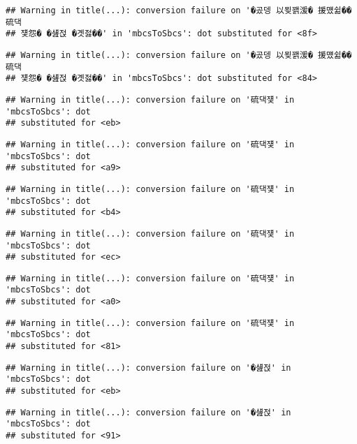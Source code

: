 \documentclass[
]{article}
\begin{document}
\begin{verbatim}
## Warning in title(...): conversion failure on '�곴뎅 以묒꽭湲� 援먰쉶�� 硫댁
## 쟻怨� �섎젅 �곗젏��' in 'mbcsToSbcs': dot substituted for <8f>
\end{verbatim}

\begin{verbatim}
## Warning in title(...): conversion failure on '�곴뎅 以묒꽭湲� 援먰쉶�� 硫댁
## 쟻怨� �섎젅 �곗젏��' in 'mbcsToSbcs': dot substituted for <84>
\end{verbatim}

\begin{verbatim}
## Warning in title(...): conversion failure on '硫댁쟻' in 'mbcsToSbcs': dot
## substituted for <eb>
\end{verbatim}

\begin{verbatim}
## Warning in title(...): conversion failure on '硫댁쟻' in 'mbcsToSbcs': dot
## substituted for <a9>
\end{verbatim}

\begin{verbatim}
## Warning in title(...): conversion failure on '硫댁쟻' in 'mbcsToSbcs': dot
## substituted for <b4>
\end{verbatim}

\begin{verbatim}
## Warning in title(...): conversion failure on '硫댁쟻' in 'mbcsToSbcs': dot
## substituted for <ec>
\end{verbatim}

\begin{verbatim}
## Warning in title(...): conversion failure on '硫댁쟻' in 'mbcsToSbcs': dot
## substituted for <a0>
\end{verbatim}

\begin{verbatim}
## Warning in title(...): conversion failure on '硫댁쟻' in 'mbcsToSbcs': dot
## substituted for <81>
\end{verbatim}

\begin{verbatim}
## Warning in title(...): conversion failure on '�섎젅' in 'mbcsToSbcs': dot
## substituted for <eb>
\end{verbatim}

\begin{verbatim}
## Warning in title(...): conversion failure on '�섎젅' in 'mbcsToSbcs': dot
## substituted for <91>
\end{verbatim}
\end{document}

